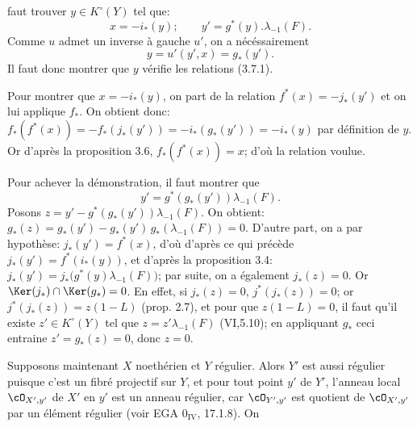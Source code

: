 faut trouver \(y\in K^\circ(Y)\) tel que:
\begin{equation}\tag{3.7.1}
x=-i_*(y);\qquad y'=g^*(y).\lambda_{-1}(F).
\end{equation}
Comme \(u\) admet un inverse à gauche \(u'\), on a nécéssairement
\[
y=u'(y',x)=g_*(y').
\]
Il faut donc montrer que \(y\) vérifie les relations (3.7.1).

Pour montrer que \(x=-i_*(y)\), on part de la relation \(f^*(x)=-j_*(y')\) et on lui applique \(f_*\). On obtient donc: \(f_*(f^*(x))=-f_*(j_*(y'))=-i_*(g_*(y'))=-i_*(y)\) par définition de \(y\). Or d'après la proposition 3.6, \(f_*(f^*(x))=x\); d'où la relation voulue.

Pour achever la démonstration, il faut montrer que
\[
y'=g^*(g_*(y'))\lambda_{-1}(F).
\]
Posons \(z=y'-g^*(g_*(y'))\lambda_{-1}(F)\). On obtient: \(g_*(z)=g_*(y')-g_*(y')\,g_*(\lambda_{-1}(F))=0\). D'autre part, on a par hypothèse: \(j_*(y')=f^*(x)\), d'où d'après ce qui précède \(j_*(y')=f^*(i_*(y))\), et d'après la proposition 3.4: \(j_*(y')=j_*\bigl(g^*(y)\lambda_{-1}(F)\bigr)\); par suite, on a également \(j_*(z)=0\). Or \(\Ker(j_*)\cap\Ker(g_*)=0\). En effet, si \(j_*(z)=0\), \(j^*(j_*(z))=0\); or \(j^*(j_*(z))=z(1-L)\) (prop. 2.7), et pour que \(z(1-L)=0\), il faut qu'il existe \(z'\in K^\circ(Y)\) tel que \(z=z'\lambda_{-1}(F)\) (VI,5.10); en appliquant \(g_*\) ceci entraine \(z'=g_*(z)=0\), donc \(z=0\).

Supposons maintenant \(X\) noethérien et \(Y\) régulier. Alors \(Y'\) est aussi régulier puisque c'est un fibré projectif sur \(Y\), et pour tout point \(y'\) de \(Y'\), l'anneau local \(\cO_{X',y'}\) de \(X'\) en \(y'\) est un anneau régulier, car \(\cO_{Y',y'}\) est quotient de \(\cO_{X',y'}\) par un élément régulier (voir EGA \(0_{\mathrm{IV}}\), 17.1.8). On
